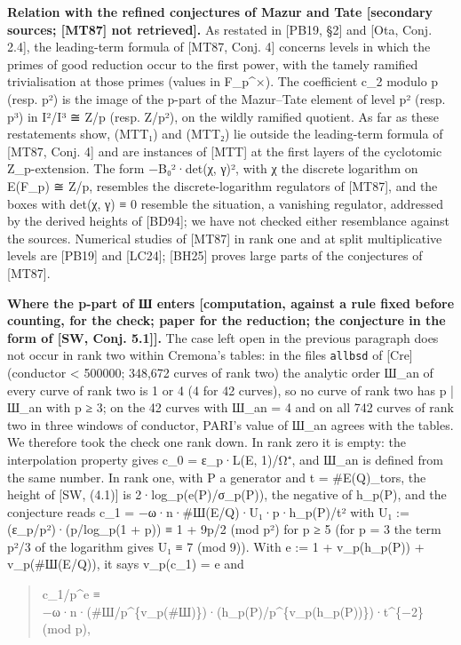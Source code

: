 \documentclass[11pt,a4paper]{article}
\theoremstyle{named}
\begin{document}
\textbf{Relation with the refined conjectures of Mazur and Tate [secondary sources; [MT87] not retrieved].} As restated in [PB19, §2] and [Ota, Conj. 2.4], the leading-term formula of [MT87, Conj. 4] concerns levels in which the primes of good reduction occur to the first power, with the tamely ramified trivialisation at those primes (values in F\_p\textasciicircum{}×). The coefficient c\_2 modulo p (resp. p²) is the image of the p-part of the Mazur–Tate element of level p² (resp. p³) in I²/I³ ≅ Z/p (resp. Z/p²), on the wildly ramified quotient. As far as these restatements show, (MTT₁) and (MTT₂) lie outside the leading-term formula of [MT87, Conj. 4] and are instances of [MTT] at the first layers of the cyclotomic Z\_p-extension. The form −B₀²·det(χ, γ)², with χ the discrete logarithm on E(F\_p) ≅ Z/p, resembles the discrete-logarithm regulators of [MT87], and the boxes with det(χ, γ) ≡ 0 resemble the situation, a vanishing regulator, addressed by the derived heights of [BD94]; we have not checked either resemblance against the sources. Numerical studies of [MT87] in rank one and at split multiplicative levels are [PB19] and [LC24]; [BH25] proves large parts of the conjectures of [MT87].

\textbf{Where the p-part of Ш enters [computation, against a rule fixed before counting, for the check; paper for the reduction; the conjecture in the form of [SW, Conj. 5.1]].} The case left open in the previous paragraph does not occur in rank two within Cremona's tables: in the files \texttt{allbsd} of [Cre] (conductor \textless{} 500000; 348,672 curves of rank two) the analytic order Ш\_an of every curve of rank two is 1 or 4 (4 for 42 curves), so no curve of rank two has p | Ш\_an with p ≥ 3; on the 42 curves with Ш\_an = 4 and on all 742 curves of rank two in three windows of conductor, PARI's value of Ш\_an agrees with the tables. We therefore took the check one rank down. In rank zero it is empty: the interpolation property gives c\_0 = ε\_p·L(E, 1)/Ω⁺, and Ш\_an is defined from the same number. In rank one, with P a generator and t = \#E(Q)\_tors, the height of [SW, (4.1)] is 2·log\_p(e(P)/σ\_p(P)), the negative of h\_p(P), and the conjecture reads c\_1 = −ω·n·\#Ш(E/Q)·U₁·p·h\_p(P)/t² with U₁ := (ε\_p/p²)·(p/log\_p(1 + p)) ≡ 1 + 9p/2 (mod p²) for p ≥ 5 (for p = 3 the term p²/3 of the logarithm gives U₁ ≡ 7 (mod 9)). With e := 1 + v\_p(h\_p(P)) + v\_p(\#Ш(E/Q)), it says v\_p(c\_1) = e and

\begin{quote}
c\_1/p\textasciicircum{}e ≡ −ω·n·(\#Ш/p\textasciicircum{}\{v\_p(\#Ш)\})·(h\_p(P)/p\textasciicircum{}\{v\_p(h\_p(P))\})·t\textasciicircum{}\{−2\} (mod p),
\end{quote}
\end{document}
